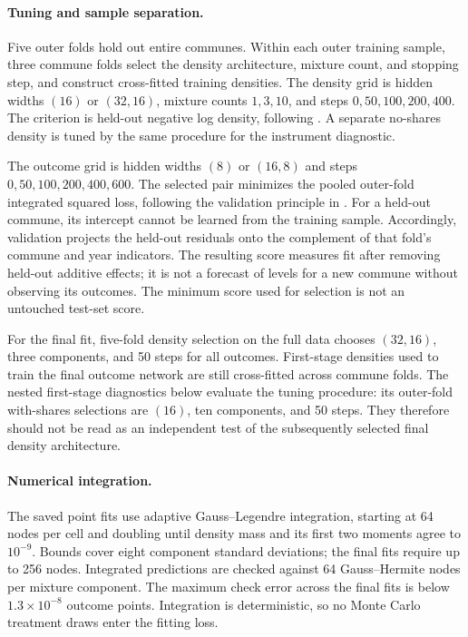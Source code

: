 \paragraph{Tuning and sample separation.}
Five outer folds hold out entire communes. Within each outer training sample, three commune folds select the density architecture, mixture count, and stopping step, and construct cross-fitted training densities. The density grid is hidden widths $(16)$ or $(32,16)$, mixture counts $1,3,10$, and steps $0,50,100,200,400$. The criterion is held-out negative log density, following \cite[eq. (13)]{deepiv}. A separate no-shares density is tuned by the same procedure for the instrument diagnostic.

The outcome grid is hidden widths $(8)$ or $(16,8)$ and steps $0,50,100,200,400,600$. The selected pair minimizes the pooled outer-fold integrated squared loss, following the validation principle in \cite[eq. (14)]{deepiv}. For a held-out commune, its intercept cannot be learned from the training sample. Accordingly, validation projects the held-out residuals onto the complement of that fold's commune and year indicators. The resulting score measures fit after removing held-out additive effects; it is not a forecast of levels for a new commune without observing its outcomes. The minimum score used for selection is not an untouched test-set score.

For the final fit, five-fold density selection on the full data chooses $(32,16)$, three components, and 50 steps for all outcomes. First-stage densities used to train the final outcome network are still cross-fitted across commune folds. The nested first-stage diagnostics below evaluate the tuning procedure: its outer-fold with-shares selections are $(16)$, ten components, and 50 steps. They therefore should not be read as an independent test of the subsequently selected final density architecture.

\paragraph{Numerical integration.}
The saved point fits use adaptive Gauss--Legendre integration, starting at 64 nodes per cell and doubling until density mass and its first two moments agree to $10^{-9}$. Bounds cover eight component standard deviations; the final fits require up to 256 nodes. Integrated predictions are checked against 64 Gauss--Hermite nodes per mixture component. The maximum check error across the final fits is below $1.3\times10^{-8}$ outcome points. Integration is deterministic, so no Monte Carlo treatment draws enter the fitting loss.

